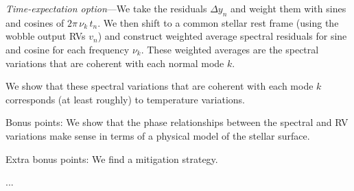 \documentclass[12pt, letterpaper]{article}
\begin{document}
\bigskip\noindent
\textsl{Time-expectation option}---We take the residuals $\Delta y_n$ and weight
them with sines and cosines of $2\pi\,\nu_k\,t_n$. We then shift to a
common stellar rest frame (using the wobble output RVs $v_n$) and
construct weighted average spectral residuals for sine and cosine for
each frequency $\nu_k$.  These weighted averages are the spectral
variations that are coherent with each normal mode $k$.

We show that these spectral variations that are coherent with each
mode $k$ corresponds (at least roughly) to temperature variations.

Bonus points: We show that the phase relationships between the
spectral and RV variations make sense in terms of a physical model of
the stellar surface.

Extra bonus points: We find a mitigation strategy.


...
\end{document}

